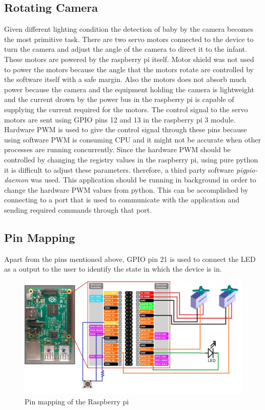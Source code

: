 \documentclass{report}
\begin{document}
\subsection{Rotating Camera}

Given different lighting condition the detection of baby by the camera becomes the most primitive task. There are two servo motors connected to the device to turn the camera and adjust the angle of the camera to direct it to the infant. These motors are powered by the raspberry pi itself. Motor shield was not used to power the motors because the angle that the motors rotate are controlled by the software itself with a safe margin. Also the motors does not absorb much power because the camera and the equipment holding the camera is lightweight and the current drown by the power bus in the raspberry pi is capable of supplying the current required for the motors.\newline
The control signal to the servo motors are sent using GPIO pins 12 and 13 in the raspberry pi 3 module. Hardware PWM is used to give the control signal through these pins because using software PWM is consuming CPU and it might not be accurate when other processes are running concurrently. Since the hardware PWM should be controlled by changing the registry values in the raspberry pi, using pure python it is difficult to adjust these parameters. therefore, a third party software \emph{pigpio-daemon} was used. This application should be running in background in order to change the hardware PWM values from python. This can be accomplished by connecting to a port that is used to communicate with the application and sending required commands through that port.




\subsection{Pin Mapping}

Apart from the pins mentioned above, GPIO pin 21 is used to connect the LED as a output to the user to identify the state in which the device is in.

\begin{figure}[H]
    \centering
    \includegraphics[scale=0.3]{pinmapping.jpg}
    \caption{Pin mapping of the Raspberry pi}
    \label{fig:Pin mapping of the Raspberry pi}
\end{figure}
\end{document}
